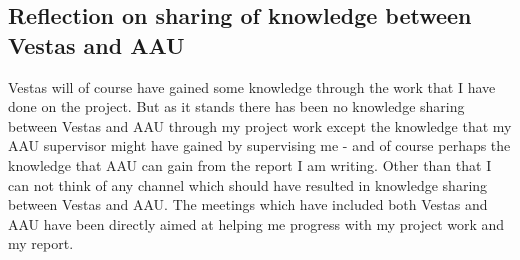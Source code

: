\subsection{Reflection on sharing of knowledge between Vestas and AAU}
Vestas will of course have gained some knowledge through the work that I have done on the project. But as it stands there has been no knowledge sharing between Vestas and AAU through my project work except the knowledge that my AAU supervisor might have gained by supervising me - and of course perhaps the knowledge that AAU can gain from the report I am writing. Other than that I can not think of any channel which should have resulted in knowledge sharing between Vestas and AAU. The meetings which have included both Vestas and AAU have been directly aimed at helping me progress with my project work and my report.
